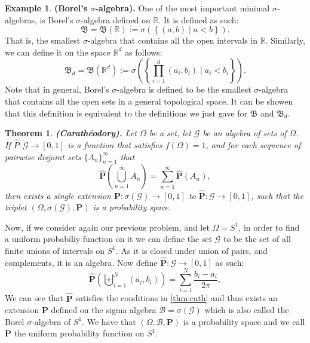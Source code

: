 \documentclass[11pt,a4paper]{article}
\theoremstyle{definition}
\newtheorem{example}{Example}[section]
\theoremstyle{plain}
\newtheorem{theorem}{Theorem}[section]
\newcommand{\R}{\mathbb{R}}
\newcommand{\set}[2]{ \left\{ #1 \mid #2 \right\} }
\renewcommand{\tt}[1]{\textnormal{\textbf{(#1).}}} %
\begin{document}
  \begin{example}
    \tt{Borel's $\sigma$-algebra}
    One of the most important minimal $\sigma$-algebras, is Borel's 
    $\sigma$-algebra defined on $\R$. It is defined as such:
    \[
      \mathfrak B = \mathfrak B(\R) := \sigma(\set{(a,b)}{a < b}).
    \]
    That is, the smallest $\sigma$-algebra that contains all the open 
    intervals in $\R$. Similarly, we can define it on the space $\R^d$
    as follows:
    \[
      \mathfrak B_d = \mathfrak B(\R^d) := 
      \sigma\left(\set{\prod_{i=1}^{d}(a_i,b_i)}{a_i < b_i}\right).
    \]
    Note that in general, Borel's $\sigma$-algebra is defined to be
    the smallest $\sigma$-algebra that contains all the open sets in a
    general topological space. It can be showen that this definition is
    equivalent to the definitions we just gave for $\mathfrak B$ and
    $\mathfrak B_d$.
  \end{example}

  \begin{theorem}\label{thm:cath}
    \tt{Carath\'eodory}
    Let $\Omega$ be a set, let $\mathcal G$ be an algebra of sets of $\Omega$.
    If $\widehat{P} \colon \mathcal G \to [0,1]$ is a function that satisfies
    $f(\Omega) = 1$, and for each sequence of pairwise disjoint sets
    $\{A_n\}_{n=1}^{\infty}$ that
      \[
        \widehat{\mathbf P} \left(\bigcup_{n=1}^{\infty}{A_n}\right) = 
        \sum_{n=1}^{\infty}{\widehat{\mathbf P}(A_n)},
      \]
    then exists a single extension 
    $\mathbf P \colon \sigma(\mathcal G) \to [0,1]$ to 
    $\widehat{\mathbf P} \colon \mathcal G \to [0,1]$, such that the triplet
    $(\Omega, \sigma(\mathcal G), \mathbf P)$ is a probability space.
  \end{theorem}

  Now, if we consider again our previous problem, and let $\Omega = S^1$,
  in order to find a uniform probabiliy function on it we can define the
  set $\mathcal G$ to be the set of all finite unions of intervals on $S^1$.
  As it is closed under union of pairs, and complements, it is an algebra.
  Now define $\widehat{\mathbf P} \colon \mathcal G \to [0,1]$ as such:
  \[
    \widehat{\mathbf{P}}\left(\biguplus_{i=1}^{N}\left(a_{i},b_{i}\right)\right)
    = \sum_{i=1}^{N}\frac{b_{i}-a_{i}}{2\pi},
  \]
  We can see that $\widehat{\mathbf P}$ satisfies the conditions in 
  \autoref{thm:cath} and thus exists an extension $\mathbf P$ defined on
  the sigma algebra $\mathcal B = \sigma(\mathcal G)$ which is also called
  the Borel $\sigma$-algebra of $S^1$. We have that 
  $(\Omega, \mathcal B, \mathbf P)$ is a probability space and we call 
  $\mathbf P$ the uniform probability function on $S^1$.
\end{document}
